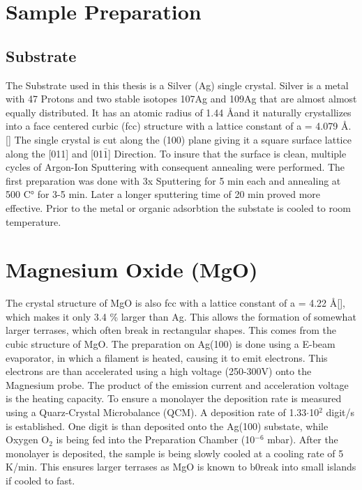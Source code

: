 \section{Sample Preparation}
\subsection{Substrate}
The Substrate used in this thesis is a Silver (Ag) single crystal.  
Silver is a metal with 47 Protons and two stable isotopes 107Ag and 109Ag that are almost almost equally distributed.
It has an atomic radius of 1.44 \AA and it naturally crystallizes into a face centered curbic (fcc) structure with a lattice constant of a = 4.079 \AA. [\cite{PhysRev.25.753}]
The single crystal is cut along the (100) plane giving it a square surface lattice along the [011] and [01$\bar{1}$] Direction.
To insure that the surface is clean, multiple cycles of Argon-Ion Sputtering with consequent annealing were performed. 
The first preparation was done with 3x Sputtering for 5 min each and annealing at 500 C° for 3-5 min.
Later a longer sputtering time of 20 min proved more effective.  
Prior to the metal or organic adsorbtion the substate is cooled to room temperature.

\section{Magnesium Oxide (MgO)}
The crystal structure of MgO is also fcc with a lattice constant of a = 4.22 \AA [\cite{guilliatt1969lattice}], which makes it only 3.4 \% larger than Ag.
This allows the formation of somewhat larger terrases, which often break in rectangular shapes. This comes from the cubic structure of MgO.
The preparation on Ag(100) is done using a E-beam evaporator, in which a filament is heated, causing it to emit electrons.
This electrons are than accelerated using a high voltage (250-300V) onto the Magnesium probe.
The product of the emission current and acceleration voltage is the heating capacity.
To ensure a monolayer the deposition rate is measured using a Quarz-Crystal Microbalance (QCM).
A deposition rate of 1.33$\cdot$10$^2$ digit/s is established.
One digit is than deposited onto the Ag(100) substate, while Oxygen O$_2$ is being fed into the Preparation Chamber (10$^{-6}$ mbar).
After the monolayer is deposited, the sample is being slowly cooled at a cooling rate of 5 K/min.
This ensures larger terrases as MgO is known to b0reak into small islands if cooled to fast.


